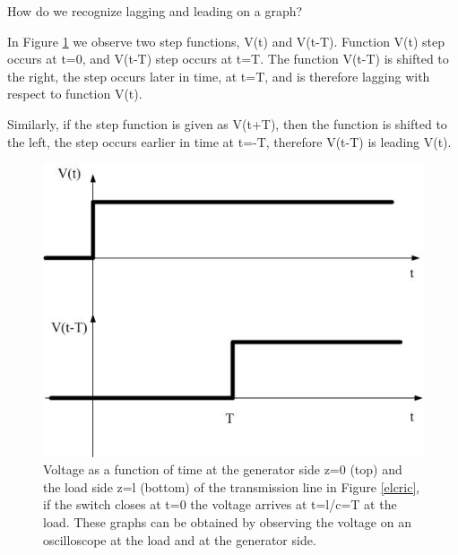 \documentclass{ximera}
\begin{document}
\begin{definition}
How do we recognize lagging and leading on a graph? 

In Figure \ref{timedelaysig} we observe two step functions, V(t) and V(t-T). Function V(t) step occurs at t=0, and V(t-T) step occurs at t=T. The function V(t-T) is shifted to the right, the step occurs later in time, at t=T, and is therefore lagging with respect to function V(t). 


Similarly, if the step function is given as V(t+T), then the function is shifted to the left, the step occurs earlier in time at t=-T, therefore V(t-T) is leading V(t).


\begin{figure}[htbp]
\begin{center}
\includegraphics[scale=0.5]{../jpg/timedelayedsignal.jpg}  
\end{center}
\caption{Voltage as a function of time at the generator side z=0 (top) and the load side z=l (bottom) of the transmission line in Figure \ref{elcric}, if the switch closes at t=0 the voltage arrives at t=l/c=T at the load. These graphs can be obtained by observing the voltage on an oscilloscope at the load and at the generator side.}
\label{timedelaysig} 
 \end{figure}
\end{definition}
\end{document}
